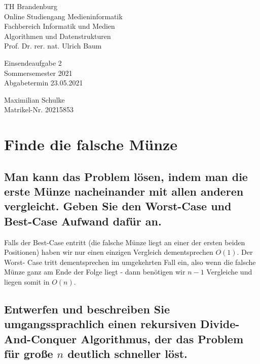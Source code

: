 \documentclass{article}
\begin{document}
\begin{titlepage}
	\begin{flushleft}
		TH Brandenburg \\
		Online Studiengang Medieninformatik \\
		Fachbereich Informatik und Medien \\
		Algorithmen und Datenstrukturen \\
		Prof. Dr. rer. nat. Ulrich Baum
	\end{flushleft}

	\vfill

	\begin{center}
		\Large{Einsendeaufgabe 2}\\[0.5em]
		\large{Sommersemester 2021}\\[0.25em]
		\large{Abgabetermin 23.05.2021}
	\end{center}

	\vfill

	\begin{flushright}
		Maximilian Schulke \\
		Matrikel-Nr. 20215853
	\end{flushright}
\end{titlepage}

\newpage

\section{Finde die falsche Münze}

\subsection{Man kann das Problem lösen, indem man die erste Münze nacheinander
mit allen anderen vergleicht. Geben Sie den Worst-Case und Best-Case Aufwand
dafür an.}

Falls der Best-Case entritt (die falsche Münze liegt an einer der ersten beiden
Positionen) haben wir nur einen einzigen Vergleich dementsprechen $O(1)$. Der
Worst- Case tritt dementsprechen im umgekehrten Fall ein, also wenn die falsche
Münze ganz am Ende der Folge liegt - dann benötigen wir $n - 1$ Vergleiche und
liegen somit in $O(n)$.

\subsection{Entwerfen und beschreiben Sie umgangssprachlich einen rekursiven
Divide-And-Conquer Algorithmus, der das Problem für große $n$ deutlich
schneller löst.}
\end{document}
